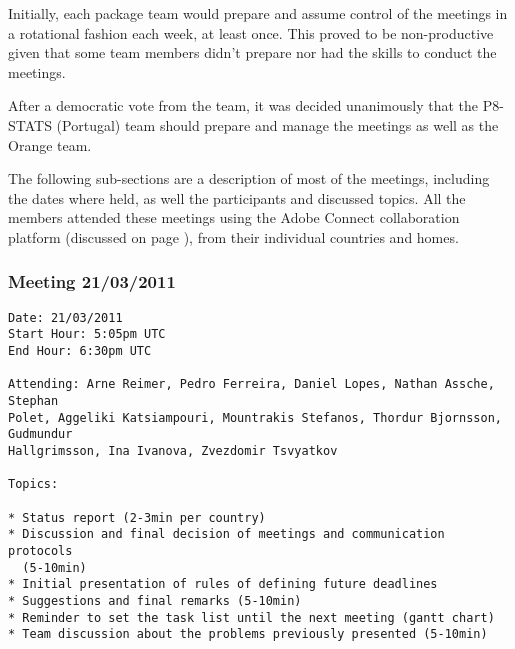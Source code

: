 Initially, each package team would prepare and assume control of the meetings in
a rotational fashion each week, at least once. This proved to be non-productive
given that some team members didn't prepare nor had the skills to conduct the
meetings.

After a democratic vote from the team, it was decided unanimously that
the P8-STATS (Portugal) team should prepare and manage the meetings as well as
the Orange team.

The following sub-sections are a description of most of the meetings, including
the dates where held, as well the participants and discussed topics. All the members
attended these meetings using the Adobe Connect collaboration platform
(discussed on page \pageref{aconnect}), from their individual countries and homes.

\newpage

\subsubsection{Meeting 21/03/2011}
\normalsize
\begin{verbatim}
Date: 21/03/2011
Start Hour: 5:05pm UTC
End Hour: 6:30pm UTC

Attending: Arne Reimer, Pedro Ferreira, Daniel Lopes, Nathan Assche, Stephan
Polet, Aggeliki Katsiampouri, Mountrakis Stefanos, Thordur Bjornsson, Gudmundur
Hallgrimsson, Ina Ivanova, Zvezdomir Tsvyatkov

Topics:

* Status report (2-3min per country)
* Discussion and final decision of meetings and communication protocols
  (5-10min)
* Initial presentation of rules of defining future deadlines
* Suggestions and final remarks (5-10min)
* Reminder to set the task list until the next meeting (gantt chart)
* Team discussion about the problems previously presented (5-10min)
\end{verbatim}

\vspace{50px}
